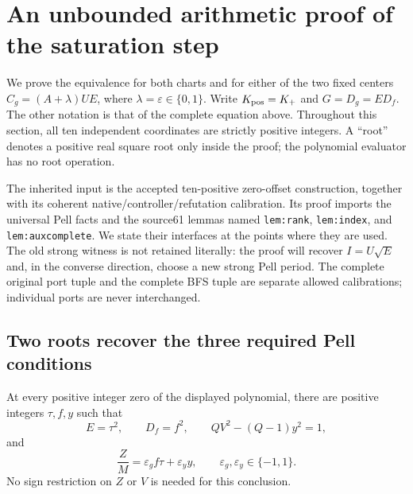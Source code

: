 \section{An unbounded arithmetic proof of the saturation step}
\label{sec:saturation-semantics}

We prove the equivalence for both charts and for either of the two
fixed centers $C_g=(A+\lambda)UE$, where $\lambda=\varepsilon\in\{0,1\}$.
Write $K_{\rm pos}=K_+$ and $G=D_g=ED_f$.  The other notation is that of the complete
equation above.  Throughout this section,
all ten independent coordinates are strictly positive integers.  A
``root'' denotes a positive real square root only inside the proof;
the polynomial evaluator has no root operation.

The inherited input is the accepted ten-positive zero-offset
construction, together with its coherent native/controller/refutation
calibration.  Its proof imports the universal Pell facts and the
source61 lemmas named \texttt{lem:rank}, \texttt{lem:index}, and
\texttt{lem:auxcomplete}.  We state their interfaces at the points
where they are used.  The old strong witness is not retained literally:
the proof will recover $I=U\sqrt E$ and, in the converse direction,
choose a new strong Pell period.  The complete original port tuple
and the complete BFS tuple are separate allowed calibrations;
individual ports are never interchanged.

\subsection{Two roots recover the three required Pell conditions}

\begin{lemma}
\label{lem:saturation-root-recovery}
At every positive integer zero of the displayed polynomial, there
are positive integers $\tau,f,y$ such that
\begin{equation}
 E=\tau^2,\qquad D_f=f^2,\qquad
 QV^2-(Q-1)y^2=1,
 \label{eq:sat-three-identities}
\end{equation}
and
\begin{equation}
 \frac ZM=\varepsilon_g f\tau+\varepsilon_y y,
 \qquad \varepsilon_g,\varepsilon_y\in\{-1,1\}.
 \label{eq:sat-signed-factor}
\end{equation}
No sign restriction on $Z$ or $V$ is needed for this conclusion.
\end{lemma}

